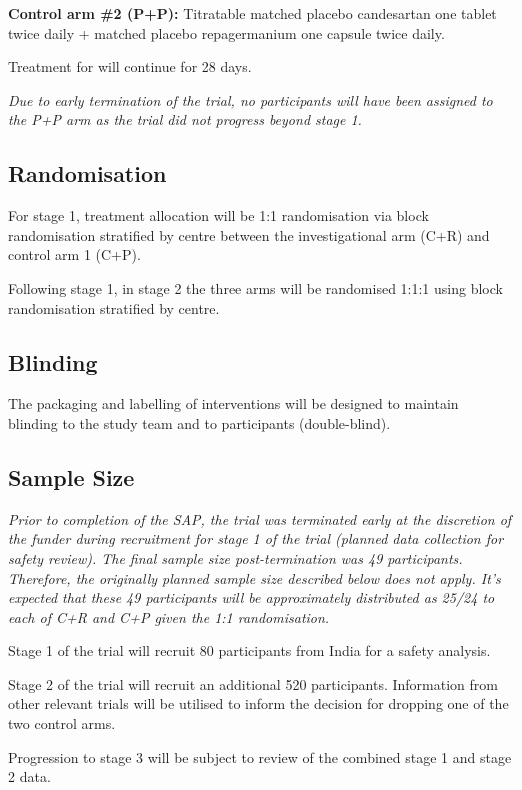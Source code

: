 \documentclass[11pt,parskip=half-]{scrartcl}
\begin{document}
\textbf{Control arm \#2 (P+P):}  Titratable matched placebo candesartan one tablet twice daily + matched placebo repagermanium one capsule twice daily.

Treatment for will continue for 28 days.

\emph{Due to early termination of the trial, no participants will have been assigned to the P+P arm as the trial did not progress beyond stage 1.}

\subsection{Randomisation}
For stage 1, treatment allocation will be 1:1 randomisation via block randomisation stratified by centre between the investigational arm (C+R) and control arm 1 (C+P).

Following stage 1, in stage 2 the three arms will be randomised 1:1:1 using block randomisation stratified by centre.

\subsection{Blinding}
The packaging and labelling of interventions will be designed to maintain blinding to the study team and to participants (double-blind).

\subsection{Sample Size}

\emph{Prior to completion of the SAP, the trial was terminated early at the discretion of the funder during recruitment for stage 1 of the trial (planned data collection for safety review). The final sample size post-termination was 49 participants. Therefore, the originally planned sample size described below does not apply. It's expected that these 49 participants will be approximately distributed as 25/24 to each of C+R and C+P given the 1:1 randomisation.}

Stage 1 of the trial will recruit 80 participants from India for a safety analysis.

Stage 2 of the trial will recruit an additional 520 participants. Information from other relevant trials will be utilised to inform the decision for dropping one of the two control arms.

Progression to stage 3 will be subject to review of the combined stage 1 and stage 2 data.

\clearpage
\end{document}
